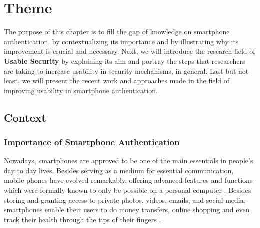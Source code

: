 
\chapter{Theme}\label{ch:second}

The purpose of this chapter is to fill the gap of knowledge on smartphone authentication, by contextualizing its importance and by illustrating why its improvement is crucial and necessary. Next, we will introduce the research field of \textbf{Usable Security} by explaining its aim and portray the steps that researchers are taking to increase usability in security mechanisms, in general. Last but not least, we will present the recent work and approaches made in the field of improving usability in smartphone authentication.   

\section{Context}

\subsection{Importance of Smartphone Authentication}


Nowadays, smartphones are approved to be one of the main essentials in people's day to day lives. Besides serving as a medium for essential communication, mobile phones have evolved remarkably, offering advanced features and functions which were formally known to only be possible on a personal computer \cite{Alsaleh}. Besides storing and granting access to private photos, videos, emails, and social media, smartphones enable their users to do money transfers, online shopping and even track their health through the tips of their fingers \cite{Egelman:2014:YRL:2660267.2660273,Albayram:2017:BUL:3235924.3235929,Schloeglhofer}. \\

